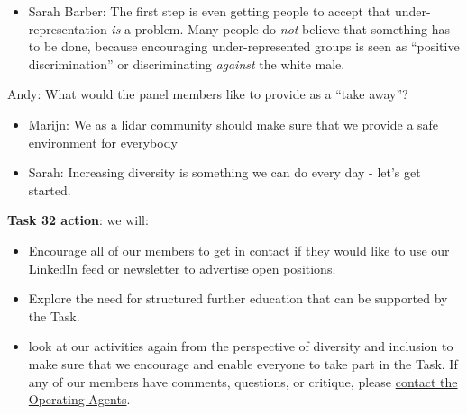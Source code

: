 \begin{itemize}
	\item Sarah Barber: The first step is even getting people to accept that under-representation \emph{is} a problem. Many people do \emph{not} believe that something has to be done, because encouraging under-represented groups is seen as \enquote{positive discrimination} or discriminating \emph{against} the white male.
\end{itemize}

Andy: What would the panel members like to provide as a \enquote{take away}?

\begin{itemize}
	\item Marijn: We as a lidar community should make sure that we provide a safe environment for everybody
	\item Sarah: Increasing diversity is something we can do every day - let's get started.
\end{itemize}

\begin{taskactions}
\textbf{Task 32 action}: we will:

\begin{itemize}
	\item Encourage all of our members to get in contact if they would like to use our LinkedIn feed or newsletter to advertise open positions.
	\item Explore the need for structured further education that can be supported by the Task.
	\item look at our activities again from the perspective of diversity and inclusion to make sure that we encourage and enable everyone to take part in the Task. If any of our members have comments, questions, or critique, please \href{mailto:ieawind.task32@ifb.uni-stuttgart.de}{contact the Operating Agents}.
\end{itemize}
\end{taskactions}